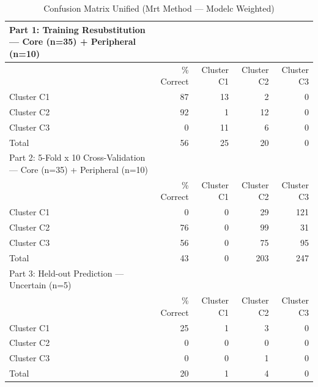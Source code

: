 \begin{table}[htbp]
  \centering
  \caption{Confusion Matrix Unified (Mrt Method — Modelc Weighted)}
  \label{tab:MRT_Method_ModelC_Weighted_tables_confusion_matrix_unified}
  \begin{tabular}{lrrrr}
    \toprule
    Part 1: Training Resubstitution — Core (n=35) + Peripheral (n=10) &  &  &  &  \\
    \midrule
     & \% Correct & Cluster C1 & Cluster C2 & Cluster C3 \\
    Cluster C1 & 87 & 13 & 2 & 0 \\
    Cluster C2 & 92 & 1 & 12 & 0 \\
    Cluster C3 & 0 & 11 & 6 & 0 \\
    Total & 56 & 25 & 20 & 0 \\
    Part 2: 5-Fold x 10 Cross-Validation — Core (n=35) + Peripheral (n=10) &  &  &  &  \\
     & \% Correct & Cluster C1 & Cluster C2 & Cluster C3 \\
    Cluster C1 & 0 & 0 & 29 & 121 \\
    Cluster C2 & 76 & 0 & 99 & 31 \\
    Cluster C3 & 56 & 0 & 75 & 95 \\
    Total & 43 & 0 & 203 & 247 \\
    Part 3: Held-out Prediction — Uncertain (n=5) &  &  &  &  \\
     & \% Correct & Cluster C1 & Cluster C2 & Cluster C3 \\
    Cluster C1 & 25 & 1 & 3 & 0 \\
    Cluster C2 & 0 & 0 & 0 & 0 \\
    Cluster C3 & 0 & 0 & 1 & 0 \\
    Total & 20 & 1 & 4 & 0 \\
    \bottomrule
  \end{tabular}
\end{table}
